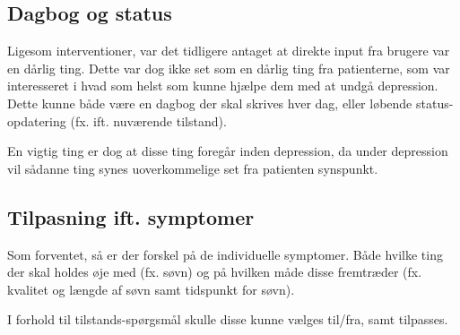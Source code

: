 \subsection{Dagbog og status}
Ligesom interventioner, var det tidligere antaget at direkte input fra brugere var en dårlig ting.
Dette var dog ikke set som en dårlig ting fra patienterne, som var interesseret i hvad som helst som kunne hjælpe dem med at undgå depression.
Dette kunne både være en dagbog der skal skrives hver dag, eller løbende status-opdatering (fx. ift. nuværende tilstand).

En vigtig ting er dog at disse ting foregår inden depression, da under depression vil sådanne ting synes uoverkommelige set fra patienten synspunkt.

\subsection{Tilpasning ift. symptomer}
Som forventet, så er der forskel på de individuelle symptomer.
Både hvilke ting der skal holdes øje med (fx. søvn) og på hvilken måde disse fremtræder (fx. kvalitet og længde af søvn samt tidspunkt for søvn).

I forhold til tilstands-spørgsmål skulle disse kunne vælges til/fra, samt tilpasses.
